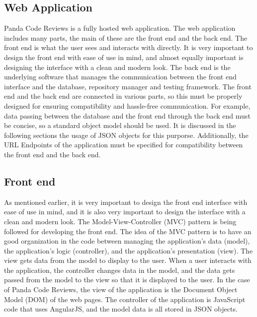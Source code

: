 
\subsection{Web Application}

Panda Code Reviews is a fully hosted web application. The web application
includes many parts, the main of these are the front end and the back end. The
front end is what the user sees and interacts with directly. It is very
important to design the front end with ease of use in mind, and almost equally
important is designing the interface with a clean and modern look. The back end
is the underlying software that manages the communication between the front end
interface and the database, repository manager and testing framework. The front
end and the back end are connected in various parts, so this must be properly
designed for ensuring compatibility and hassle-free communication. For example,
data passing between the database and the front end through the back end must
be concise, so a standard object model should be used. It is discussed in the
following sections the usage of JSON objects for this purporse. Additionally,
the URL Endpoints of the application must be specified for compatibility
between the front end and the back end.

\subsection{Front end}

As mentioned earlier, it is very important to design the front end interface
with ease of use in mind, and it is also very important to design the interface
with a clean and modern look. The Model-View-Controller (MVC) pattern is being
followed for developing the front end. The idea of the MVC pattern is to have an
good organization in the code between managing the application's data (model),
the application's logic (controller), and the application's presentation (view).
The view gets data from the model to display to the user. When a user interacts
with the application, the controller changes data in the model, and the data
gets passed from the model to the view so that it is displayed to the user. In
the case of Panda Code Reviews, the view of the application is the Document
Object Model (DOM) of the web pages. The controller of the application is
JavaScript code that uses AngularJS, and the model data is all stored in JSON
objects.

